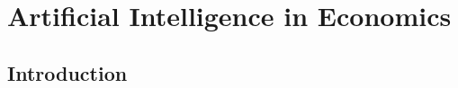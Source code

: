 \chapter{Artificial Intelligence in Economics}
\label{chap:Artificial_Intelligence_in_Economics}

\section{Introduction}

